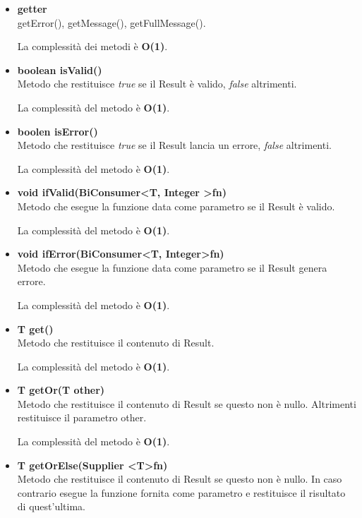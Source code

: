 \documentclass[a4paper, 12pt]{scrreprt}
\begin{document}
				\begin{itemize}
					\item \textbf{getter}
					\\getError(), getMessage(), getFullMessage().
					
					La complessit\`a dei metodi è \textbf{O(1)}.
					
					\item\textbf{boolean isValid()}
					\\Metodo che restituisce \textit{true} se il Result \`e valido, \textit{false} altrimenti.
					
					La complessit\`a del metodo è \textbf{O(1)}.
					
					\item\textbf{boolen isError()}
					\\Metodo che restituisce \textit{true} se il Result lancia un errore, \textit{false} altrimenti.
					
					La complessit\`a del metodo è \textbf{O(1)}.
	
					\item\textbf{void ifValid(BiConsumer\textless T, Integer \textgreater fn)}
					\\Metodo che esegue la funzione data come parametro se il Result \`e valido.
					
					La complessit\`a del metodo è \textbf{O(1)}.
	
					\item\textbf{void ifError(BiConsumer\textless T, Integer\textgreater fn)}
					\\Metodo che esegue la funzione data come parametro se il Result genera errore.
					
					La complessit\`a del metodo è \textbf{O(1)}.
	
					\item \textbf{T get()}
					\\Metodo che restituisce il contenuto di Result.
					
					La complessit\`a del metodo è \textbf{O(1)}.
	
					\item \textbf{T getOr(T other)}
					\\Metodo che restituisce il contenuto di Result se questo non \`e nullo. Altrimenti restituisce il parametro other.
					
					La complessit\`a del metodo è \textbf{O(1)}.
	
					\item \textbf{T getOrElse(Supplier \textless T\textgreater fn)}
					\\Metodo che restituisce il contenuto di Result se questo non \`e nullo. In caso contrario esegue la funzione fornita come parametro e restituisce il risultato di quest'ultima.
					

\end{itemize}
\end{document}
